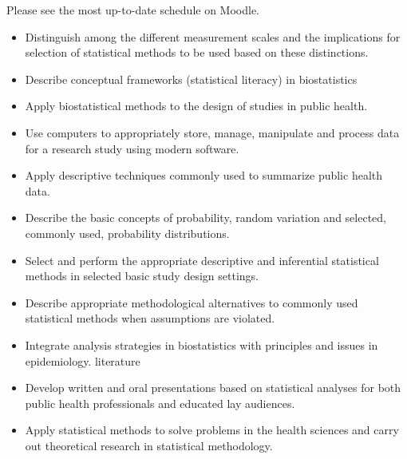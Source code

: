 \documentclass[10pt]{article}
\begin{document}
\bigskip
{}

Please see the most up-to-date schedule on Moodle.

  \clearpage
\bigskip
{}
\begin{itemize}
\item Distinguish among the different measurement scales and the implications for selection of statistical methods to be used based on these distinctions.
\item Describe conceptual frameworks (statistical literacy) in biostatistics
\item Apply biostatistical methods to the design of studies in public health.
\item Use computers to appropriately store, manage, manipulate and process data for a research study using modern software.
\item Apply descriptive techniques commonly used to summarize public health data.
\item Describe the basic concepts of probability, random variation and selected, commonly used, probability distributions.
\item Select and perform the appropriate descriptive and inferential statistical methods in selected basic study design settings.
\item Describe appropriate methodological alternatives to commonly used statistical methods when assumptions are violated.
\item Integrate analysis strategies in biostatistics with principles and issues in epidemiology.
literature
\item Develop written and oral presentations based on statistical analyses for both public health professionals and educated lay audiences.
\item Apply statistical methods to solve problems in the health sciences and carry out theoretical research in statistical methodology.
\end{itemize}
\end{document}
